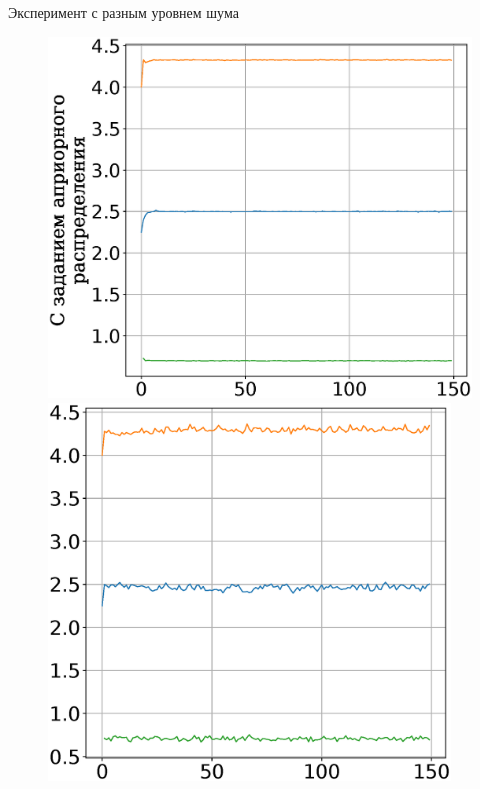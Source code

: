 \documentclass[10pt,pdf,hyperref={unicode}]{beamer}
\begin{document}

\begin{frame}{Эксперимент с разным уровнем шума}
\justifying

\begin{figure}[h]
\begin{minipage}{.32\textwidth}
\hspace{-3mm}
      \includegraphics[width = 1.05\textwidth]{figures/910noise.eps}
\end{minipage}
\begin{minipage}{.32\textwidth}
\vspace{2pt}
\hspace{-2.1mm}
      \includegraphics[width = 0.95\textwidth]{figures/911noise.eps}

\end{minipage}
\end{figure}
\end{frame}
\end{document}
